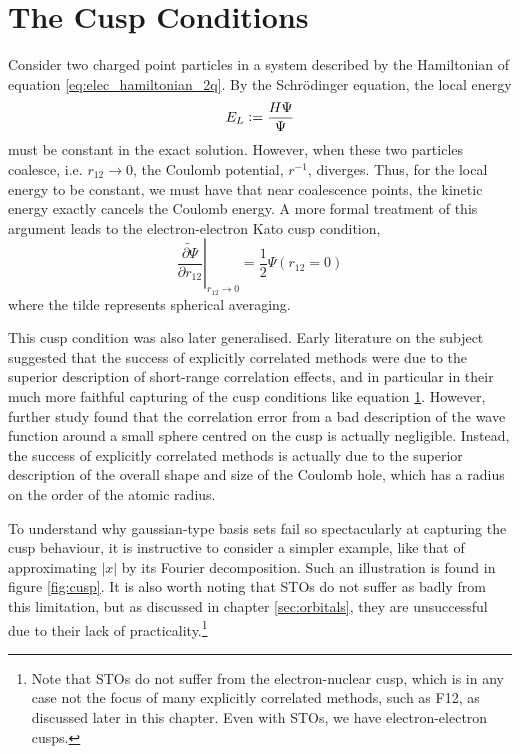\section{The Cusp Conditions}
\label{sec:cusp}

Consider two charged point particles in a system described by the Hamiltonian of equation \eqref{eq:elec_hamiltonian_2q}. By the Schr\"odinger equation, the local energy
\begin{equation}
    E_L\mathrel{\mathop:}= \frac{H\Psi}{\Psi}
\end{equation}
must be constant in the exact solution. However, when these two particles coalesce, i.e. $r_{12}\to 0$, the Coulomb potential, $r^{-1}$, diverges. Thus, for the local energy to be constant, we must have that near coalescence points, the kinetic energy exactly cancels the Coulomb energy. A more formal treatment of this argument leads to the electron-electron Kato cusp condition,\cite{katoEigenfunctionsManyparticleSystems1957a}
\begin{equation}
    \label{eq:cusp}
    \left.\widetilde{\frac{\partial \Psi}{\partial r_{12}}}\right|_{r_{12}\to 0}
    = \frac 12 \Psi(r_{12}=0)
\end{equation}
where the tilde represents spherical averaging.

This cusp condition was also later generalised.\cite{packCuspConditionsMolecular1966,kurokawaChapterTwoGeneral2016}
Early literature on the subject suggested that the success of explicitly correlated methods were due to the superior description of short-range correlation effects, and in particular in their much more faithful capturing of the cusp conditions like equation \ref{sec:cusp}.\cite{roothaanAnalytical1960,watsonApproximate1960,weissConfiguration1961,schwartzGround1962}
However, further study found that the correlation error from a bad description of the wave function around a small sphere centred on the cusp is actually negligible.\cite{coulsonElectron1961,gilbertInterpretation1963,prendergastImpact2001,klopperR122007} Instead, the success of explicitly correlated methods is actually due to the superior description of the overall shape and size of the Coulomb hole, which has a radius on the order of the atomic radius.

To understand why gaussian-type basis sets fail so spectacularly at capturing the cusp behaviour, it is instructive to consider a simpler example, like that of approximating $|x|$ by its Fourier decomposition. Such an illustration is found in figure \ref{fig:cusp}. It is also worth noting that \glspl{STO} do not suffer as badly from this limitation,\cite{kongExplicitly2011} but as discussed in chapter \ref{sec:orbitals}, they are unsuccessful due to their lack of practicality.\footnote{Note that \glspl{STO} do not suffer from the electron-nuclear cusp, which is in any case not the focus of many explicitly correlated methods, such as F12, as discussed later in this chapter. Even with \glspl{STO}, we have electron-electron cusps.}


